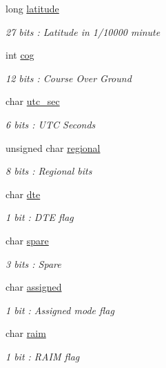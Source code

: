 \begin{DoxyCompactItemize}
long \mbox{\hyperlink{structaismsg__9_ad09461b522182e4611aee0b00f6fb363}{latitude}}
\begin{DoxyCompactList}\small\item\em 27 bits \+: Latitude in 1/10000 minute \end{DoxyCompactList}\item 
int \mbox{\hyperlink{structaismsg__9_a5220b7d7fe7f9e4e4b2ea298255fd357}{cog}}
\begin{DoxyCompactList}\small\item\em 12 bits \+: Course Over Ground \end{DoxyCompactList}\item 
char \mbox{\hyperlink{structaismsg__9_a83ae2d2e1685c564df365bc1bdc1c419}{utc\+\_\+sec}}
\begin{DoxyCompactList}\small\item\em 6 bits \+: U\+TC Seconds \end{DoxyCompactList}\item 
unsigned char \mbox{\hyperlink{structaismsg__9_a071f16f358ffbc5b85c9f0e5540fa7e5}{regional}}
\begin{DoxyCompactList}\small\item\em 8 bits \+: Regional bits \end{DoxyCompactList}\item 
char \mbox{\hyperlink{structaismsg__9_a0a29f6881fc19c47d4d4801d7d27b30f}{dte}}
\begin{DoxyCompactList}\small\item\em 1 bit \+: D\+TE flag \end{DoxyCompactList}\item 
char \mbox{\hyperlink{structaismsg__9_a1b9cadb72d7a98790eab470df9bd4393}{spare}}
\begin{DoxyCompactList}\small\item\em 3 bits \+: Spare \end{DoxyCompactList}\item 
char \mbox{\hyperlink{structaismsg__9_a4877f217abcbbb89cd4b49b141c6f730}{assigned}}
\begin{DoxyCompactList}\small\item\em 1 bit \+: Assigned mode flag \end{DoxyCompactList}\item 
char \mbox{\hyperlink{structaismsg__9_a62055e7800d3222ddea078ed282865fc}{raim}}
\begin{DoxyCompactList}\small\item\em 1 bit \+: R\+A\+IM flag \end{DoxyCompactList}\item 

\end{DoxyCompactItemize}

